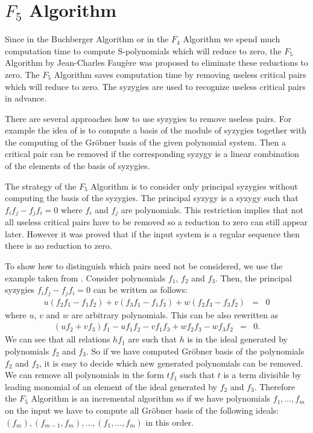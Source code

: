 

\section{$F_5$ Algorithm}
Since in the Buchberger Algorithm or in the $F_4$ Algorithm we spend much computation time to compute S-polynomials which will reduce to zero, the $F_5$ Algorithm \cite{F5} by Jean-Charles Faug\`ere was proposed to eliminate these reductions to zero. The $F_5$ Algorithm saves computation time by removing useless critical pairs which will reduce to zero. The syzygies \cite{Cox-Little-Shea97} are used to recognize useless critical pairs in advance.

There are several approaches how to use syzygies to remove useless pairs. For example the idea of \cite{GBSyzygies} is to compute a basis of the module of syzygies together with the computing of the Gr\"obner basis of the given polynomial system. Then a critical pair can be removed if the corresponding syzygy is a linear combination of the elements of the basis of syzygies.

The strategy of the $F_5$ Algorithm is to consider only principal syzygies without computing the basis of the syzygies. The principal syzygy is a syzygy such that $f_if_j - f_jf_i = 0$ where $f_i$ and $f_j$ are polynomials. This restriction implies that not all useless critical pairs have to be removed so a reduction to zero can still appear later. However it was proved that if the input system is a regular sequence then there is no reduction to zero.

To show how to distinguish which pairs need not be considered, we use the example taken from \cite{F5}. Consider polynomials $f_1$, $f_2$ and $f_3$. Then, the principal syzygies $f_if_j - f_jf_i = 0$ can be written as follows:
\begin{eqnarray}
  u(f_2f_1 - f_1f_2) + v(f_3f_1 - f_1f_3) + w(f_2f_3 - f_3f_2) &=& 0
\end{eqnarray}
where $u$, $v$ and $w$ are arbitrary polynomials. This can be also rewritten as
\begin{eqnarray}
  (uf_2 + vf_3)f_1 - uf_1f_2 - vf_1f_3 + wf_2f_3 - wf_3f_2 &=& 0.
\end{eqnarray}
We can see that all relations $hf_1$ are such that $h$ is in the ideal generated by polynomials $f_2$ and $f_3$. So if we have computed Gr\"obner basis of the polynomials $f_2$ and $f_3$, it is easy to decide which new generated polynomials can be removed. We can remove all polynomials in the form $t f_1$ such that $t$ is a term divisible by leading monomial of an element of the ideal generated by $f_2$ and $f_3$. Therefore the $F_5$ Algorithm is an incremental algorithm so if we have polynomials $f_1, \dots, f_m$ on the input we have to compute all Gr\"obner basis of the following ideals: $(f_m), (f_{m-1}, f_m), \dots, (f_1, \dots, f_m)$ in this order.

